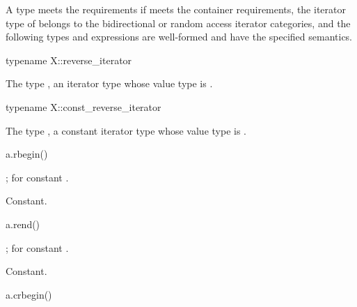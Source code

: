 \pnum
A type  meets the  requirements if
 meets the container requirements,
the iterator type of  belongs to the
bidirectional or random access iterator categories,
and
the following types and expressions are well-formed and have
the specified semantics.

%
\begin{itemdecl}
typename X::reverse_iterator
\end{itemdecl}

\begin{itemdescr}
\pnum
\result
The type ,
an iterator type whose value type is .
\end{itemdescr}

%
\begin{itemdecl}
typename X::const_reverse_iterator
\end{itemdecl}

\begin{itemdescr}
\pnum
\result
The type ,
a constant iterator type whose value type is .
\end{itemdescr}

%
\begin{itemdecl}
a.rbegin()
\end{itemdecl}

\begin{itemdescr}
\pnum
\result
{};
 for constant .

\pnum
\returns
{}

\pnum
\complexity
Constant.
\end{itemdescr}

%
\begin{itemdecl}
a.rend()
\end{itemdecl}

\begin{itemdescr}
\pnum
\result
{};
 for constant .

\pnum
\returns
{}

\pnum
\complexity
Constant.
\end{itemdescr}

%
\begin{itemdecl}
a.crbegin()
\end{itemdecl}

